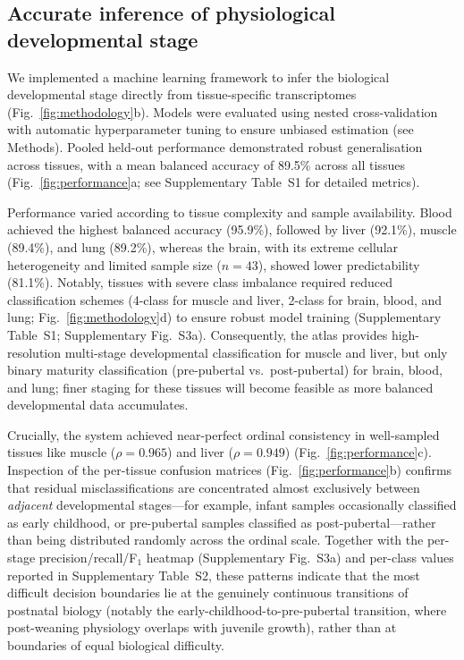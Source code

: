 \documentclass[10pt,a4paper]{article}
\newcommand{\figref}[1]{Fig.~\ref{#1}}
\begin{document}
\subsection{Accurate inference of physiological developmental stage}

We implemented a machine learning framework to infer the biological developmental stage directly from tissue-specific transcriptomes (\figref{fig:methodology}b). Models were evaluated using nested cross-validation with automatic hyperparameter tuning to ensure unbiased estimation (see Methods). Pooled held-out performance demonstrated robust generalisation across tissues, with a mean balanced accuracy of 89.5\% across all tissues (\figref{fig:performance}a; see Supplementary Table~S1 for detailed metrics).

Performance varied according to tissue complexity and sample availability. Blood achieved the highest balanced accuracy (95.9\%), followed by liver (92.1\%), muscle (89.4\%), and lung (89.2\%), whereas the brain, with its extreme cellular heterogeneity and limited sample size ($n = 43$), showed lower predictability (81.1\%). Notably, tissues with severe class imbalance required reduced classification schemes (4-class for muscle and liver, 2-class for brain, blood, and lung; \figref{fig:methodology}d) to ensure robust model training (Supplementary Table~S1; Supplementary Fig.~S3a). Consequently, the atlas provides high-resolution multi-stage developmental classification for muscle and liver, but only binary maturity classification (pre-pubertal vs.\ post-pubertal) for brain, blood, and lung; finer staging for these tissues will become feasible as more balanced developmental data accumulates.

Crucially, the system achieved near-perfect ordinal consistency in well-sampled tissues like muscle ($\rho = 0.965$) and liver ($\rho = 0.949$) (\figref{fig:performance}c). Inspection of the per-tissue confusion matrices (\figref{fig:performance}b) confirms that residual misclassifications are concentrated almost exclusively between \emph{adjacent} developmental stages---for example, infant samples occasionally classified as early childhood, or pre-pubertal samples classified as post-pubertal---rather than being distributed randomly across the ordinal scale. Together with the per-stage precision/recall/F$_1$ heatmap (Supplementary Fig.~S3a) and per-class values reported in Supplementary Table~S2, these patterns indicate that the most difficult decision boundaries lie at the genuinely continuous transitions of postnatal biology (notably the early-childhood-to-pre-pubertal transition, where post-weaning physiology overlaps with juvenile growth), rather than at boundaries of equal biological difficulty.
\end{document}
